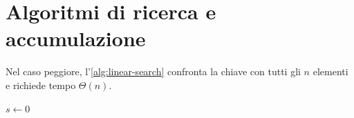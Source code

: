 \documentclass{../../../unipd-notes}
\begin{document}
\chapter{Algoritmi di ricerca e accumulazione}

\begin{algorithm}[htbp]
  \caption{Ricerca lineare}
  \label{alg:linear-search}
  \Return{$\bot$}\;
\end{algorithm}

Nel caso peggiore, l'\cref{alg:linear-search} confronta la chiave con tutti gli $n$ elementi e richiede tempo $\Theta(n)$.

\begin{algorithm}[htbp]
  \caption{Checksum additivo a otto bit}
  \label{alg:additive-checksum}
  $s\gets 0$\;
  \;
\end{algorithm}

\clearpage
\begin{algorithm}[H]
  \caption{Ricerca binaria con intervallo chiuso}
  \label{alg:binary-search}
\end{algorithm}
\end{document}
